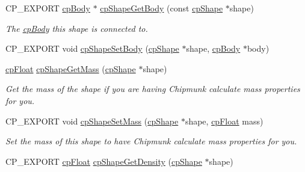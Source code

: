 \begin{DoxyCompactItemize}
\mbox{\label{group__cp_shape_ga43f431640b65b51aaa28abd7127af1a1}} 
C\+P\+\_\+\+E\+X\+P\+O\+RT \mbox{\hyperlink{structcp_body}{cp\+Body}} $\ast$ \mbox{\hyperlink{group__cp_shape_ga43f431640b65b51aaa28abd7127af1a1}{cp\+Shape\+Get\+Body}} (const \mbox{\hyperlink{structcp_shape}{cp\+Shape}} $\ast$shape)
\begin{DoxyCompactList}\small\item\em The \mbox{\hyperlink{structcp_body}{cp\+Body}} this shape is connected to. \end{DoxyCompactList}\item 
C\+P\+\_\+\+E\+X\+P\+O\+RT void \mbox{\hyperlink{group__cp_shape_ga222501265d75e838459285452a92d6f5}{cp\+Shape\+Set\+Body}} (\mbox{\hyperlink{structcp_shape}{cp\+Shape}} $\ast$shape, \mbox{\hyperlink{structcp_body}{cp\+Body}} $\ast$body)
\item 
\mbox{\label{group__cp_shape_ga5d7f4b7e91b1e7062ae84acb41aa47ba}} 
\mbox{\hyperlink{group__basic_types_gac1ed65573e035bf892505768c852d8d3}{cp\+Float}} \mbox{\hyperlink{group__cp_shape_ga5d7f4b7e91b1e7062ae84acb41aa47ba}{cp\+Shape\+Get\+Mass}} (\mbox{\hyperlink{structcp_shape}{cp\+Shape}} $\ast$shape)
\begin{DoxyCompactList}\small\item\em Get the mass of the shape if you are having Chipmunk calculate mass properties for you. \end{DoxyCompactList}\item 
\mbox{\label{group__cp_shape_ga82c8046837b24d08b9ea0b3da6c795a4}} 
C\+P\+\_\+\+E\+X\+P\+O\+RT void \mbox{\hyperlink{group__cp_shape_ga82c8046837b24d08b9ea0b3da6c795a4}{cp\+Shape\+Set\+Mass}} (\mbox{\hyperlink{structcp_shape}{cp\+Shape}} $\ast$shape, \mbox{\hyperlink{group__basic_types_gac1ed65573e035bf892505768c852d8d3}{cp\+Float}} mass)
\begin{DoxyCompactList}\small\item\em Set the mass of this shape to have Chipmunk calculate mass properties for you. \end{DoxyCompactList}\item 
\mbox{\label{group__cp_shape_gae9c80582330ded34941ca4890160575c}} 
C\+P\+\_\+\+E\+X\+P\+O\+RT \mbox{\hyperlink{group__basic_types_gac1ed65573e035bf892505768c852d8d3}{cp\+Float}} \mbox{\hyperlink{group__cp_shape_gae9c80582330ded34941ca4890160575c}{cp\+Shape\+Get\+Density}} (\mbox{\hyperlink{structcp_shape}{cp\+Shape}} $\ast$shape)

\end{DoxyCompactItemize}
